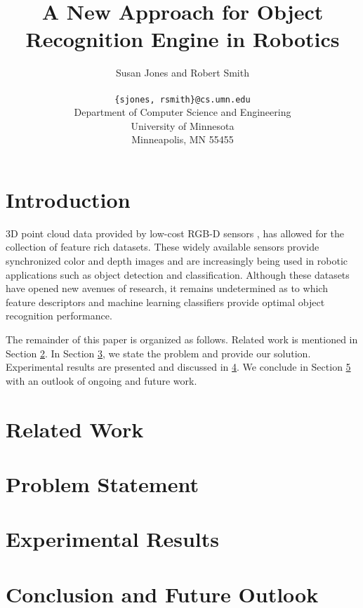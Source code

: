\documentclass[letterpaper, 10 pt, conference]{ieeeconf}
\title{\bf
A New Approach for Object Recognition Engine in Robotics
}
\author{\parbox{5 in}{\centering Susan Jones and Robert Smith}\\
  {\tt\small \{sjones, rsmith\}@cs.umn.edu}\\
  Department of Computer Science and Engineering\\
  University of Minnesota\\
  Minneapolis, MN 55455\\
}
\begin{document}
\maketitle
\thispagestyle{empty}
\pagestyle{empty}

\begin{abstract}
\end{abstract}

\section{Introduction}
3D point cloud data provided by low-cost RGB-D sensors \cite{kinect}, has
allowed for the collection of feature rich datasets. These widely available
sensors provide synchronized color and depth images and are increasingly being
used in robotic applications such as object detection and classification.
Although these datasets have opened new avenues of research, it remains
undetermined as to which feature descriptors and machine learning classifiers
provide optimal object recognition performance. 

The remainder of this paper is organized as follows. Related work is mentioned 
in Section \ref{sec:related_work}. In Section \ref{sec:problem_statement}, we
state the problem and provide our solution. Experimental results are presented
and discussed in \ref{sec:experimental_results}. We conclude in 
Section \ref{sec:conclusion} with an outlook of ongoing and future work.

\section{Related Work}
\label{sec:related_work}

\section{Problem Statement}
\label{sec:problem_statement}

\section{Experimental Results}
\label{sec:experimental_results}

\section{Conclusion and Future Outlook}
\label{sec:conclusion}



\end{document}

